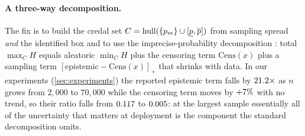 \paragraph{A three-way decomposition.} The fix is to build the credal set
$C=\mathrm{hull}(\{p_m\}\cup[\underline{p},\overline{p}])$ from sampling spread \emph{and} the
identified box and to use the imprecise-probability decomposition
\citep{abellan2005difference}: total $\max_CH$ equals aleatoric $\min_CH$ plus
the censoring term $\mathrm{Cens}(x)$ plus a sampling term
$[\text{epistemic}-\mathrm{Cens}(x)]_+$ that shrinks with data. In our
experiments (\cref{sec:experiments}) the reported epistemic term falls by
$21.2\times$ as $n$ grows from $2{,}000$ to $70{,}000$ while the
censoring term moves by $+7\%$ with no trend, so their
ratio falls from $0.117$ to $0.005$: at the
largest sample essentially all of the uncertainty that matters at deployment
is the component the standard decomposition omits.
